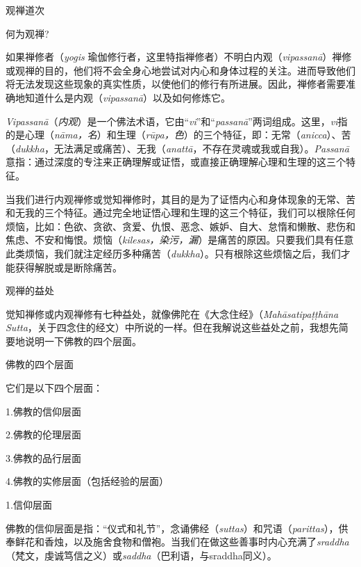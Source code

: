 


\beginchapter 观禅道次


\subsectnon \1何为观禅?

如果禅修者（{\it yogis} 瑜伽修行者，这里特指禅修者）不明白内观（{\it vipassan\=a\/}）禅修或观禅的目的，他们将不会全身心地尝试对内心和身体过程的关注。进而导致他们将无法发现这些现象的真实性质，以使他们的修行有所进展。因此，禅修者需要准确地知道什么是内观（{\it vipassan\=a}）以及如何修炼它。

{\it Vipassan\=a\/}（{\it 内观}）是一个佛法术语，它由“{\it vi}”和“{\it passan\=a}”两词组成。这里，{\it vi}指的是心理（{\it n\=ama，名}）和生理（{\it r\=upa，色}）的三个特征，即：无常（{\it anicca}）、苦（{\it dukkha}，无法满足或痛苦）、无我（{\it anatt\=a}，不存在灵魂或我或自我）。{\it Passan\=a}意指：通过深度的专注来正确理解或证悟，或直接正确理解心理和生理的这三个特征。

当我们进行内观禅修或觉知禅修时，其目的是为了证悟内心和身体现象的无常、苦和无我的三个特征。通过完全地证悟心理和生理的这三个特征，我们可以根除任何烦恼，比如：色欲、贪欲、贪爱、仇恨、恶念、嫉妒、自大、怠惰和懒散、悲伤和焦虑、不安和悔恨。烦恼（{\it kilesas，染污，漏}）是痛苦的原因。只要我们具有任意此类烦恼，我们就注定经历多种痛苦\1（{\it dukkha}）。只有根除这些烦恼之后，我们才能获得解脱或是断除痛苦。

\subsectnon 观禅的益处

觉知禅修或内观禅修有七种益处，就像佛陀在《大念住经》（{\it Mah\=asatipa\d t\d th\=ana Sutta}，关于四念住的经文）中所说的一样。但在我解说这些益处之前，我想先简要地说明一下佛教的四个层面。

\ssubsectnon 佛教的四个层面

它们是以下四个层面：
\smallskip

{
\leftskip=1.6pc
\item{1.}佛教的信仰层面
\item{2.}佛教的伦理层面
\item{3.}佛教的品行层面
\item{4.}佛教的实修层面（包括经验的层面）

}
\bigskip

\sssubsectnon 1.信仰层面

佛教的信仰层面是指：“仪式和礼节”，念诵佛经（{\it suttas}）和咒语（{\it parittas}），供奉鲜花和香烛，以及施舍食物和僧袍。当我们在做这些善事时内心充满了{\it sraddha}（梵文，虔诚笃信之义）或{\it saddha}（巴利语，与sraddha同义）。

